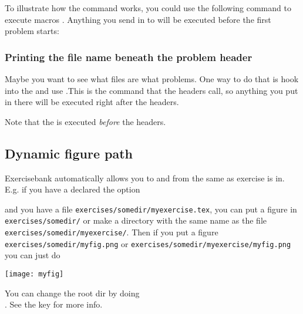 To illustrate how the  command works, you could use the following command to execute macros . Anything you send in to  will be executed before the first problem starts:
\begin{dispListing}
  \At\StartBuildset{
    
  }
\end{dispListing}
\subsubsection{Printing the file name beneath the problem header}
Maybe you want to see what files are what problems. One way to do that is hook into the  and use .This is the command that the headers call, so anything you put in there will be executed right after the headers.

\begin{dispListing}
  \At\VeryBeginProblem{
    \exerciseFile\\
  }
\end{dispListing}

Note that the  is executed \emph{before} the headers.

\subsection{Dynamic figure path}
Exercisebank automatically allows you to  and  from
the same as exercise is in. E.g. if you have a declared the option
\begin{dispListing}
\end{dispListing}
 and you have a file \texttt{exercises/somedir/myexercise.tex}, you can put a figure in \texttt{exercises/somedir/} or make a directory with the same name as the file \texttt{exercises/somedir/myexercise/}. Then if you put a figure  \texttt{exercises/somedir/myfig.png} or \texttt{exercises/somedir/myexercise/myfig.png} you can just do
\begin{dispListing}
  \texttt{[image: myfig]}
\end{dispListing}

You can change the root dir by doing \\
. See the  key for more info.

